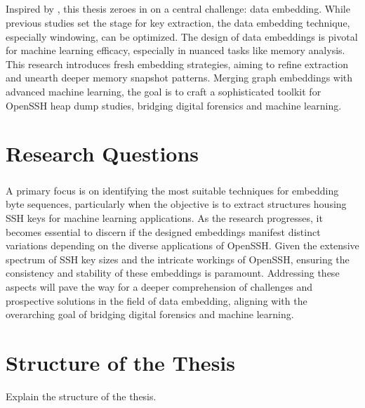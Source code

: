 \paragraph*{}Inspired by , this thesis zeroes in on a central challenge: data embedding. While previous studies set the stage for key extraction, the data embedding technique, especially windowing, can be optimized. The design of data embeddings is pivotal for machine learning efficacy, especially in nuanced tasks like memory analysis. This research introduces fresh embedding strategies, aiming to refine extraction and unearth deeper memory snapshot patterns. Merging graph embeddings with advanced machine learning, the goal is to craft a sophisticated toolkit for OpenSSH heap dump studies, bridging digital forensics and machine learning.


\chapter{Research Questions}

\paragraph*{}A primary focus is on identifying the most suitable techniques for embedding byte sequences, particularly when the objective is to extract structures housing SSH keys for machine learning applications. As the research progresses, it becomes essential to discern if the designed embeddings manifest distinct variations depending on the diverse applications of OpenSSH. Given the extensive spectrum of SSH key sizes and the intricate workings of OpenSSH, ensuring the consistency and stability of these embeddings is paramount. Addressing these aspects will pave the way for a deeper comprehension of challenges and prospective solutions in the field of data embedding, aligning with the overarching goal of bridging digital forensics and machine learning.

\chapter{Structure of the Thesis}

Explain the structure of the thesis. 
